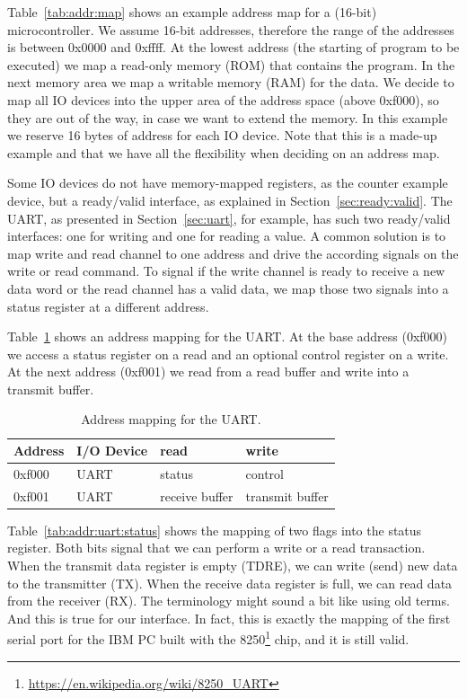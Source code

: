 \documentclass[%
    10pt,
    headinclude, footexclude,
    openright, %
    notitlepage,
    cleardoubleempty,
    headsepline,
    pointlessnumbers,
    bibtotoc, idxtotoc,
    ]{scrbook}
\newcommand{\myref}[2]{\href{#1}{#2}}
\renewcommand{\myref}[2]{{#2}{\footnote{\url{#1}}}}
\begin{document}
Table~\ref{tab:addr:map} shows an example address map for a (16-bit) microcontroller.
We assume 16-bit addresses, therefore the range of the addresses is between 0x0000 and
0xffff.
At the lowest address (the starting of program to be executed) we map a read-only
memory (ROM) that contains the program. In the next memory area we map
a writable memory (RAM) for the data. We decide to map all IO devices into the
upper area of the address space (above 0xf000), so they are out of the way, in case
we want to extend the memory. In this example we reserve 16 bytes of address for
each IO device. Note that this is a made-up example and that we have all the flexibility when
deciding on an address map.

Some IO devices do not have memory-mapped registers, as the counter example device,
but a ready/valid interface, as explained in Section~\ref{sec:ready:valid}.
The UART, as presented in Section~\ref{sec:uart}, for example, has such two
ready/valid interfaces: one for writing and one for reading a value.
A common solution is to map write and read channel to one address and drive
the according signals on the write or read command. To signal if the write channel
is ready to receive a new data word or the read channel has a valid data, we map
those two signals into a status register at a different address.

Table~\ref{tab:addr:uart} shows an address mapping for the UART. At the base address (0xf000)
we access a status register on a read and an optional control register on a write.
At the next address (0xf001) we read from a read buffer and write into
a transmit buffer.

\begin{table}
\centering
\begin{tabular}{llll}
\toprule
Address & I/O Device & read & write \\
\midrule
0xf000 & UART & status & control \\
0xf001 & UART & receive buffer & transmit buffer \\
\bottomrule
\end{tabular}
\caption{Address mapping for the UART.}
\label{tab:addr:uart}
\end{table}

Table~\ref{tab:addr:uart:status} shows the mapping of two flags into the status register.
Both bits signal that we can perform a write or a read transaction. When the transmit data register
is empty (TDRE), we can write (send) new data to the transmitter (TX).
When the receive data register is full, we can read data from the receiver (RX).
The terminology might sound a bit like using old terms. And this is true for our
interface. In fact, this is exactly the mapping of the first serial port for the IBM PC
built with the \myref{https://en.wikipedia.org/wiki/8250_UART}{8250} chip,
and it is still valid.
\end{document}
